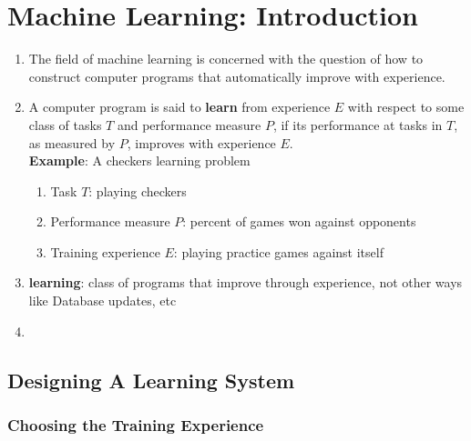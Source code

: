 \chapter{Machine Learning: Introduction}

\begin{enumerate}
    \item The field of machine learning is concerned with the question of how to construct computer programs that automatically improve with experience.
    \hfill \cite{ml/book/Machine-Learning/Tom-M-Mitchell}

    \item A computer program is said to \textbf{learn} from experience $E$ with respect to some class of tasks $T$ and performance measure $P$, if its performance at tasks in $T$, as measured by $P$, improves with experience $E$.
    \hfill \cite{ml/book/Machine-Learning/Tom-M-Mitchell}
    \\
    \textbf{Example}: A checkers learning problem
    \begin{enumerate}
        \item Task $T$: playing checkers
        \hfill \cite{ml/book/Machine-Learning/Tom-M-Mitchell}
        
        \item Performance measure $P$: percent of games won against opponents
        \hfill \cite{ml/book/Machine-Learning/Tom-M-Mitchell}
        
        \item Training experience $E$: playing practice games against itself 
        \hfill \cite{ml/book/Machine-Learning/Tom-M-Mitchell}
    \end{enumerate}
    
    \item \textbf{learning}: class of programs that improve through experience, not other ways like Database updates, etc
    \hfill \cite{ml/book/Machine-Learning/Tom-M-Mitchell}

    \item 
\end{enumerate}



\section{Designing A Learning System}

\subsection{Choosing the Training Experience \cite{ml/book/Machine-Learning/Tom-M-Mitchell}}

